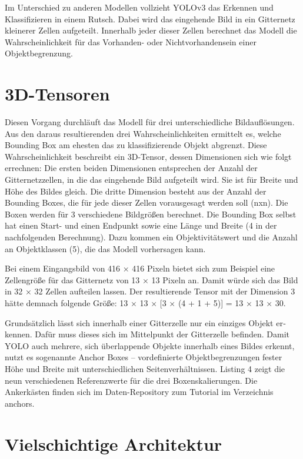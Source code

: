 Im Unterschied zu anderen Modellen vollzieht YOLOv3 das Erkennen und Klassifizieren in einem Rutsch. Dabei wird das eingehende Bild in ein Gitternetz kleinerer Zellen aufgeteilt. Innerhalb jeder dieser Zellen berechnet das Modell die Wahrscheinlichkeit für das Vorhanden- oder Nichtvorhandensein einer Objektbegrenzung. 

\section{3D-Tensoren}

Diesen Vorgang durchläuft das Modell für drei unterschiedliche Bildauflösungen. Aus den daraus resultierenden drei Wahrscheinlichkeiten ermittelt es, welche Bounding Box am ehesten das zu klassifizierende Objekt abgrenzt. Diese Wahrscheinlichkeit beschreibt ein 3D-Tensor, dessen Dimensionen sich wie folgt errechnen: Die ersten beiden Dimensionen entsprechen der Anzahl der Gitternetzzellen, in die das eingehende Bild aufgeteilt wird. Sie ist für Breite und Höhe des Bildes gleich. Die dritte Dimension besteht aus der Anzahl der Bounding Boxes, die für jede dieser Zellen vorausgesagt werden soll (nxn). Die Boxen werden für 3 verschiedene Bildgrößen berechnet. Die Bounding Box selbst hat einen Start- und einen Endpunkt sowie eine Länge und Breite (4 in der nachfolgenden Berechnung). Dazu kommen ein Objektivitätswert und die Anzahl an Objektklassen (5), die das Modell vorhersagen kann. 

Bei einem Eingangsbild von 416 × 416 Pixeln bietet sich zum Beispiel eine Zellen­größe für das Gitternetz von 13 × 13 Pixeln an. Damit würde sich das Bild in 32 × 32 Zellen aufteilen lassen. Der resultierende Tensor mit der Dimension 3 hätte demnach folgende Größe: 13 × 13 × [3 × (4 + 1 + 5)] = 13 × 13 × 30. 

Grundsätzlich lässt sich innerhalb ­einer Gitterzelle nur ein einziges Objekt er­kennen. Dafür muss dieses sich im Mittelpunkt der Gitterzelle befinden. Damit YOLO auch mehrere, sich überlappende Objekte innerhalb eines Bildes erkennt, nutzt es sogenannte Anchor Boxes – vordefinierte Objektbegrenzungen fester Höhe und Breite mit unterschiedlichen Seitenverhältnissen. Listing 4 zeigt die neun verschiedenen Referenzwerte für die drei Boxenskalierungen. Die Ankerkästen finden sich im Daten-Repository zum Tutorial im Verzeichnis anchors. 

\section{Vielschichtige Architektur}

